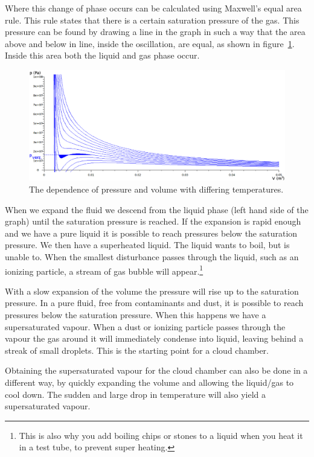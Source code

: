 \documentclass[12pt,a4paper]{article}
\numberwithin{equation}{section}
\numberwithin{figure}{section}
\numberwithin{table}{section}
\begin{document}
Where this change of phase occurs can be calculated using Maxwell's equal area rule. This rule states that there is a certain saturation pressure of the gas. This pressure can be found by drawing a line in the graph in such a way that the area above and below in line, inside the oscillation, are equal, as shown in figure~\ref{fig:vdw0}. Inside this area both the liquid and gas phase occur. 

\begin{figure}\begin{center}
\includegraphics[scale=0.38]{vdwaals0.eps}%
\caption{The dependence of pressure and volume with differing temperatures.}\label{fig:vdw0}
\end{center}\end{figure}

When we expand the fluid we descend from the liquid phase (left hand side of the graph) until the saturation pressure is reached. If the expansion is rapid enough and we have a pure liquid it is possible to reach pressures below the saturation pressure. We then have a superheated liquid. The liquid wants to boil, but is unable to. When the smallest disturbance passes through the liquid, such as an ionizing particle, a stream of gas bubble will appear.\footnote{This is also why you add boiling chips or stones to a liquid when you heat it in a test tube, to prevent super heating.}

With a slow expansion of the volume the pressure will rise up to the saturation pressure. In a pure fluid, free from contaminants and dust, it is possible to reach pressures below the saturation pressure. When this happens we have a supersaturated vapour. When a dust or ionizing particle passes through the vapour the gas around it will immediately condense into liquid, leaving behind a streak of small droplets. This is the starting point for a cloud chamber.

Obtaining the supersaturated vapour for the cloud chamber can also be done in a different way, by quickly expanding the volume and allowing the liquid/gas to cool down. The sudden and large drop in temperature will also yield a supersaturated vapour.
\end{document}
